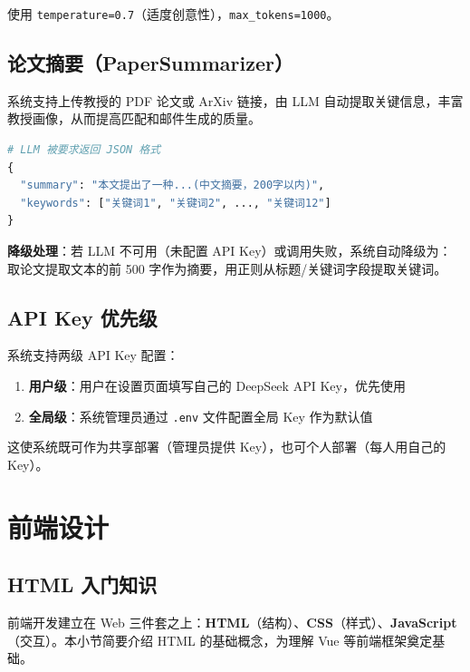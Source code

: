 \documentclass[11pt]{article}
\begin{document}
使用 \texttt{temperature=0.7}（适度创意性），\texttt{max\_tokens=1000}。

\subsection{论文摘要（PaperSummarizer）}

系统支持上传教授的 PDF 论文或 ArXiv 链接，由 LLM 自动提取关键信息，丰富教授画像，从而提高匹配和邮件生成的质量。

\begin{lstlisting}[language=Python, caption=论文摘要输出格式]
# LLM 被要求返回 JSON 格式
{
  "summary": "本文提出了一种...(中文摘要，200字以内)",
  "keywords": ["关键词1", "关键词2", ..., "关键词12"]
}
\end{lstlisting}

\textbf{降级处理}：若 LLM 不可用（未配置 API Key）或调用失败，系统自动降级为：取论文提取文本的前 500 字作为摘要，用正则从标题/关键词字段提取关键词。

\subsection{API Key 优先级}

系统支持两级 API Key 配置：

\begin{enumerate}
    \item \textbf{用户级}：用户在设置页面填写自己的 DeepSeek API Key，优先使用
    \item \textbf{全局级}：系统管理员通过 \texttt{.env} 文件配置全局 Key 作为默认值
\end{enumerate}

这使系统既可作为共享部署（管理员提供 Key），也可个人部署（每人用自己的 Key）。

\section{前端设计}

\subsection{HTML 入门知识}

前端开发建立在 Web 三件套之上：\textbf{HTML}（结构）、\textbf{CSS}（样式）、\textbf{JavaScript}（交互）。本小节简要介绍 HTML 的基础概念，为理解 Vue 等前端框架奠定基础。
\end{document}
